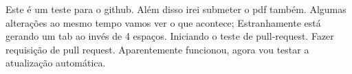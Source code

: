 \documentclass{article}
\begin{document}
	Este é um teste para o github.
	Além disso irei submeter o pdf também.
	Algumas alterações ao mesmo tempo vamos ver o que acontece;
	Estranhamente está gerando um tab ao invés de 4 espaços.
	Iniciando o teste de pull-request.
	Fazer requisição de pull request.
	Aparentemente funcionou, agora vou testar a atualização
	automática.
\end{document}
